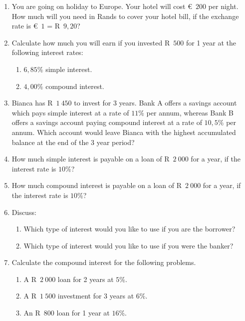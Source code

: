 \begin{eocexercises}{}
    \begin{enumerate}[label=\textbf{\arabic*}.]
	\item You are going on holiday to Europe. Your hotel will cost €~$200$ per night. How much will you need in Rands to cover your hotel bill, if the exchange rate is €~$1$ = R~$9,20$?

	\item Calculate how much you will earn if you invested R~$500$ for 1 year at the following interest rates:
	\begin{enumerate}[noitemsep, label=\textbf{(\alph*)} ]
	    \item $6,85\%$ simple interest.
	    \item $4,00\%$ compound interest.
	\end{enumerate}

	\item Bianca has R~$1~450$ to invest for 3 years. Bank A offers a savings account which pays simple interest at a rate of $11\%$ per annum, whereas Bank B offers a savings account paying compound interest at a rate of $10,5\%$ per annum. Which account would leave Bianca with the highest accumulated balance at the end of the 3 year period?

	\item How much simple interest is payable on a loan of R~$2~000$ for a year, if the interest rate is $10\%$?

	\item How much compound interest is payable on a loan of R~$2~000$ for a year, if the interest rate is $10\%$?

	\item Discuss:
	\begin{enumerate}[noitemsep, label=\textbf{(\alph*)} ]
	    \item Which type of interest would you like to use if you are the borrower?

	    \item Which type of interest would you like to use if you were the banker?
	\end{enumerate}

	\item Calculate the compound interest for the following problems.
	\begin{enumerate}[noitemsep, label=\textbf{(\alph*)} ]
	    \item A R~$2~000$ loan for 2 years at $5\%$.
	    \item A R~$1~500$ investment for 3 years at $6\%$.
	    \item An R~$800$ loan for 1 year at $16\%$.
	\end{enumerate}


\end{enumerate}
\end{eocexercises}
